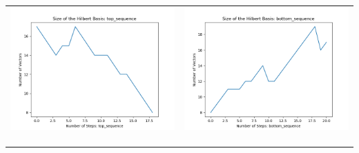 \documentclass[10pt]{article}
\begin{document}
\begin{tabular}{c|c}
\begin{minipage}{.4\textwidth}
\includegraphics[width=\textwidth]{"DATA/4d/5 generators 2 bound A/top_sequence SIZE"}
\end{minipage} &
\begin{minipage}{.4\textwidth}
\includegraphics[width=\textwidth]{"DATA/4d/5 generators 2 bound A bottomup/bottom_sequence SIZE"}
\end{minipage} \\ \\
\hline \\\begin{minipage}{.4\textwidth}

\end{minipage}
\end{tabular}
\end{document}

